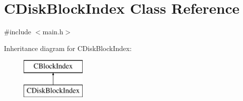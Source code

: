 \hypertarget{class_c_disk_block_index}{}\section{C\+Disk\+Block\+Index Class Reference}
\label{class_c_disk_block_index}


{\ttfamily \#include $<$main.\+h$>$}

Inheritance diagram for C\+Disk\+Block\+Index\+:\begin{figure}[H]
\begin{center}
\leavevmode
\includegraphics[height=2.000000cm]{class_c_disk_block_index}
\end{center}
\end{figure}
